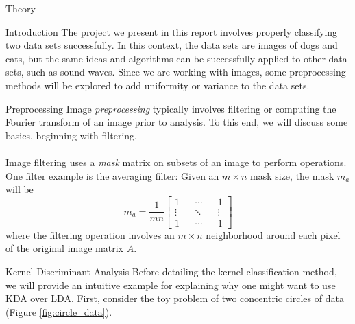 \begin{section}{Theory}

\begin{subsection}{Introduction}
The project we present in this report involves properly classifying two data sets successfully. In this context, the data sets are images of dogs and cats, but the same ideas and algorithms can be successfully applied to other data sets, such as sound waves. Since we are working with images, some preprocessing methods will be explored to add uniformity or variance to the data sets. 
\end{subsection}

\begin{subsection}{Preprocessing}
Image \textit{preprocessing} typically involves filtering or computing the Fourier transform of an image prior to analysis. To this end, we will discuss some basics, beginning with filtering. 
\\
\\
Image filtering uses a \textit{mask} matrix on subsets of an image to perform operations. One filter example is the averaging filter: Given an $m \times n$ mask size, the mask $m_a$will be
$$
	m_a = \frac{1}{mn} \begin{bmatrix} 1 && \cdots && 1 \\ \vdots && \ddots && \vdots \\ 1 && \cdots && 1 \end{bmatrix}
$$
where the filtering operation involves an $m\times n$ neighborhood around each pixel of the original image matrix $A$.

\end{subsection}

\begin{subsection}{Kernel Discriminant Analysis}
Before detailing the kernel classification method, we will provide an intuitive example for explaining why one might want to use KDA over LDA. First, consider the toy problem of two concentric circles of data (Figure \ref{fig:circle_data}).


\end{subsection}
\end{section}
